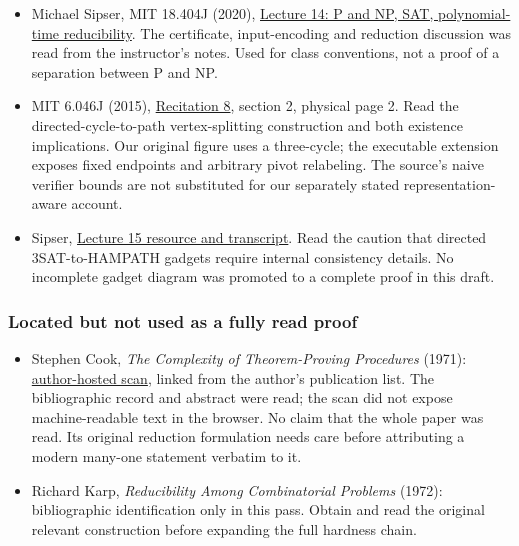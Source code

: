 \begin{itemize}
\tightlist
\item
  Michael Sipser, MIT 18.404J (2020),
  \href{https://ocw.mit.edu/courses/18-404j-theory-of-computation-fall-2020/45e2fd621349cfd7c9faf93a6ba134a3_MIT18_404f20_lec14.pdf}{Lecture
  14: P and NP, SAT, polynomial-time reducibility}. The certificate,
  input-encoding and reduction discussion was read from the instructor's
  notes. Used for class conventions, not a proof of a separation between
  P and NP.
\item
  MIT 6.046J (2015),
  \href{https://ocw.mit.edu/courses/6-046j-design-and-analysis-of-algorithms-spring-2015/1dee182d301235b901119a0ff57f05e2_MIT6_046JS15_Recitation8.pdf}{Recitation
  8}, section 2, physical page 2. Read the directed-cycle-to-path
  vertex-splitting construction and both existence implications. Our
  original figure uses a three-cycle; the executable extension exposes
  fixed endpoints and arbitrary pivot relabeling. The source's naive
  verifier bounds are not substituted for our separately stated
  representation-aware account.
\item
  Sipser,
  \href{https://ocw.mit.edu/courses/18-404j-theory-of-computation-fall-2020/resources/lecture-15-np-completeness/}{Lecture
  15 resource and transcript}. Read the caution that directed
  3SAT-to-HAMPATH gadgets require internal consistency details. No
  incomplete gadget diagram was promoted to a complete proof in this
  draft.
\end{itemize}

\subsubsection{Located but not used as a fully read
proof}\label{located-but-not-used-as-a-fully-read-proof}

\begin{itemize}
\tightlist
\item
  Stephen Cook, \emph{The Complexity of Theorem-Proving Procedures}
  (1971):
  \href{https://www.cs.toronto.edu/~sacook/homepage/1971.pdf}{author-hosted
  scan}, linked from the author's publication list. The bibliographic
  record and abstract were read; the scan did not expose
  machine-readable text in the browser. No claim that the whole paper
  was read. Its original reduction formulation needs care before
  attributing a modern many-one statement verbatim to it.
\item
  Richard Karp, \emph{Reducibility Among Combinatorial Problems} (1972):
  bibliographic identification only in this pass. Obtain and read the
  original relevant construction before expanding the full hardness
  chain.
\end{itemize}


